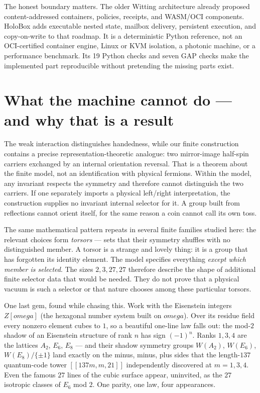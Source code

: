 \documentclass[11pt]{article}
\def\mathbb#1{#1}%
\def\omega{omega}%
\begin{document}
The honest boundary matters. The older Witting architecture already proposed
content-addressed containers, policies, receipts, and WASM/OCI components.
HoloBox adds executable nested state, mailbox delivery, persistent execution,
and copy-on-write to that roadmap. It is a deterministic Python reference, not
an OCI-certified container engine, Linux or KVM isolation, a photonic machine,
or a performance benchmark. Its 19 Python checks and seven GAP checks make the
implemented part reproducible without pretending the missing parts exist.

\section{What the machine cannot do --- and why that is a result}

The weak interaction distinguishes handedness, while our finite construction
contains a precise representation-theoretic analogue: two mirror-image
half-spin carriers exchanged by an internal orientation reversal.  That is a
theorem about the finite model, not an identification with physical fermions.
Within the model, any invariant respects the symmetry and therefore cannot
distinguish the two carriers.  If one separately imports a physical
left/right interpretation, the construction supplies no invariant internal
selector for it.  A group built from reflections cannot orient itself, for the
same reason a coin cannot call its own toss.

The same mathematical pattern repeats in several finite families studied here:
the relevant choices form \emph{torsors} --- sets that their symmetry shuffles
with no distinguished member.
A torsor is a strange and lovely thing: it is a group that has forgotten its
identity element. The model specifies everything \emph{except which member is
selected}. The sizes $2,3,27,27$ therefore describe the shape of additional
finite selector data that would be needed. They do not prove that a physical
vacuum is such a selector or that nature chooses among these particular
torsors.

One last gem, found while chasing this. Work with the Eisenstein integers
$\mathbb{Z}[\omega]$ (the hexagonal number system built on $\omega$). Over its
residue field every nonzero element cubes to $1$, so a beautiful one-line law
falls out: the mod-$2$ shadow of an Eisenstein structure of rank $n$ has sign
$(-1)^n$. Ranks $1, 3, 4$ are the lattices $A_2$, $E_6$, $E_8$ --- and their
shadow symmetry groups $W(A_2)$, $W(E_6)$, $W(E_8)/\{\pm1\}$ land exactly on
the minus, minus, plus sides that the length-$137$ quantum-code tower
$[[137m,m,21]]$ independently discovered at $m=1,3,4$. Even the famous $27$
lines of the cubic surface appear, uninvited, as the $27$ isotropic classes of
$E_6$ mod $2$. One parity, one law, four appearances.
\end{document}
